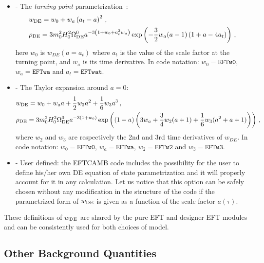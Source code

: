 \documentclass[prd,nofootinbib,showpacs]{revtex4}
\begin{document}
{\begin{itemize}
\item[] - The {\it turning point} parametrization~\cite{Hu:2014ega}: 
\begin{align}
& w_{\rm DE} = w_0 +w_a\left(a_t-a \right)^2 \,, \nonumber \\
&  \rho_{\rm DE} = 3 m_0^2 H_0^2 \Omega^0_{\rm DE} a^{-3 \left(1+w_0+a_t^2 w_a\right)}\exp \left(-\frac{3}{2}w_a(a-1)\left(1+a-4a_t \right)\right) \,,
\end{align}
here $w_0$ is $w_{DE}(a=a_t)$ where $a_t$ is the value of the scale factor at the turning point, and  $w_a$ is its time derivative. 
In code notation: $w_0 = \texttt{EFTw0}$, $w_a = \texttt{EFTwa}$ and $a_t = \texttt{EFTwat}$. 
\item[] - The Taylor expansion around $a=0$:
\begin{align}
& w_{\rm DE} = w_0 + w_a a + \frac{1}{2}w_2 a^2 +\frac{1}{6}w_3 a^3 \,, \nonumber \\
& \rho_{\rm DE} = 3 m_0^2 H_0^2 \Omega^0_{\rm DE} a^{-3(1+w_0)} \exp \left((1-a) \left(3w_a + \frac{3}{4}w_2(a+1) +\frac{1}{6}w_3(a^2+a+1) \right)
\right) \,,
\end{align}
 where $w_2$ and $w_3$ are respectively the 2nd and 3rd time derivatives of $w_{DE}$.
In code notation: $w_0 = \texttt{EFTw0}$, $w_a = \texttt{EFTwa}$, $w_2 = \texttt{EFTw2}$ and $w_3 = \texttt{EFTw3}$.
\item[] - User defined: the EFTCAMB code includes the possibility for the user to define his/her own DE equation of state parametrization and it will properly account for it in any calculation. Let us notice that this option can be safely chosen without any modification in the structure of the code if the parametrized form of $w_{\rm DE}$ is given as a function of the scale factor $a(\tau)$.
\end{itemize}
%
These definitions of $w_{\rm DE}$ are shared by the pure EFT and designer EFT modules and can be consistently used for both choices of model.
%

\subsection{Other Background Quantities} \label{SubSec:EFTBackgroundQ}
%

}
\end{document}
